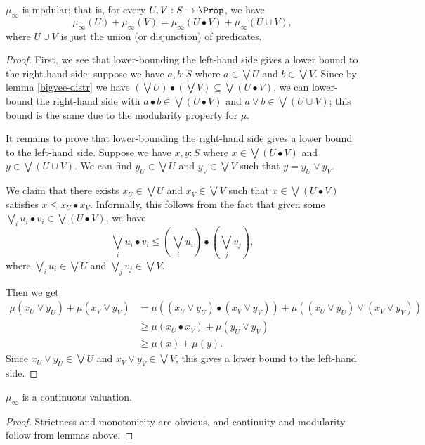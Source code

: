 \begin{lemma}
$\mu_\infty$ is modular; that is, for every $U, V : S \to \Prop$, we have
\[
\mu_\infty(U) + \mu_\infty(V) = \mu_\infty(U \bullet V) + \mu_\infty(U \cup V),
\]
where $U \cup V$ is just the union (or disjunction) of predicates.
\end{lemma}
\begin{proof}
First, we see that lower-bounding the left-hand side gives a lower bound to the right-hand side: suppose we have $a, b : S$ where $a \in \bigvee U$ and $b \in \bigvee V$. Since by lemma \ref{bigvee-distr} we have $(\bigvee U) \bullet (\bigvee V) \subseteq \bigvee (U \bullet V)$, we can lower-bound the right-hand side with $a \bullet b \in \bigvee (U \bullet V)$ and $a \vee b \in \bigvee (U \cup V)$; this bound is the same due to the modularity property for $\mu$.

It remains to prove that lower-bounding the right-hand side gives a lower bound to the left-hand side. Suppose we have $x, y : S$ where $x \in \bigvee (U \bullet V)$ and $y \in \bigvee (U \cup V)$. We can find $y_U \in \bigvee U$ and $y_V \in \bigvee V$ such that $y = y_U \vee y_V$.

We claim that there exists $x_U \in \bigvee U$ and $x_V \in \bigvee V$ such that $x \in \bigvee (U \bullet V)$ satisfies $x \le x_U \bullet x_V$. Informally, this follows from the fact that given some $\bigvee_i u_i \bullet v_i \in \bigvee (U \bullet V)$, we have 
\[
\bigvee_i u_i \bullet v_i \le \left( \bigvee_i u_i \right) \bullet \left( \bigvee_j v_j \right),
\]
where $\bigvee_i u_i \in \bigvee U$ and $\bigvee_j v_j \in \bigvee V$.

Then we get
\begin{align*}
\mu(x_U \vee y_U) + \mu(x_V \vee y_V)
  &= \mu((x_U \vee y_U) \bullet (x_V \vee y_V)) + \mu((x_U \vee y_U) \vee (x_V \vee y_V))
  \tag{modular}
  \\ &\ge \mu(x_U \bullet x_V) + \mu(y_U \vee y_V)
  \\ &\ge \mu(x) + \mu(y). \tag{monotone}
\end{align*}
Since $x_U \vee y_U \in \bigvee U$ and $x_V \vee y_V \in \bigvee V$, this gives a lower bound to the left-hand side.
\end{proof}

\begin{theorem}
$\mu_\infty$ is a continuous valuation.
\end{theorem}
 
\begin{proof}
Strictness and monotonicity are obvious, and continuity and modularity follow from lemmas above.
\end{proof}

